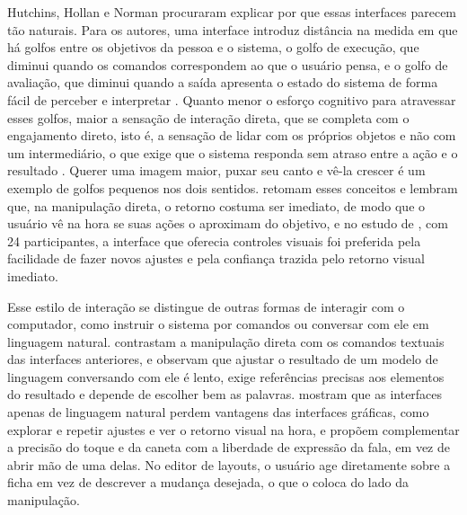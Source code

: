Hutchins, Hollan e Norman procuraram explicar por que essas interfaces parecem tão naturais. Para os autores, uma interface introduz distância na medida em que
há golfos entre os objetivos da pessoa e o sistema, o golfo de execução, que diminui quando os comandos correspondem ao que o usuário pensa, e o golfo de
avaliação, que diminui quando a saída apresenta o estado do sistema de forma fácil de perceber e interpretar \cite{Hutchins1985}. Quanto menor o esforço
cognitivo para atravessar esses golfos, maior a sensação de interação direta, que se completa com o engajamento direto, isto é, a sensação de lidar com os
próprios objetos e não com um intermediário, o que exige que o sistema responda sem atraso entre a ação e o resultado \cite{Hutchins1985}. Querer
uma imagem maior, puxar seu canto e vê-la crescer é um exemplo de golfos pequenos nos dois sentidos.  retomam esses conceitos e
lembram que, na manipulação direta, o retorno costuma ser imediato, de modo que o usuário vê na hora se suas ações o aproximam do objetivo, e no estudo de
, com 24 participantes, a interface que oferecia controles visuais foi preferida pela facilidade de fazer novos ajustes e pela
confiança trazida pelo retorno visual imediato.

Esse estilo de interação se distingue de outras formas de interagir com o computador, como instruir o sistema por comandos ou conversar com ele em linguagem
natural.  contrastam a manipulação direta com os comandos textuais das interfaces anteriores, e 
observam que ajustar o resultado de um modelo de linguagem conversando com ele é lento, exige referências precisas aos elementos do resultado e depende de
escolher bem as palavras.  mostram que as interfaces apenas de linguagem natural perdem vantagens das interfaces gráficas, como
explorar e repetir ajustes e ver o retorno visual na hora, e  propõem complementar a precisão do toque e da caneta com a liberdade de
expressão da fala, em vez de abrir mão de uma delas. No editor de layouts, o usuário age diretamente sobre a ficha em vez de descrever a mudança desejada, o
que o coloca do lado da manipulação.

